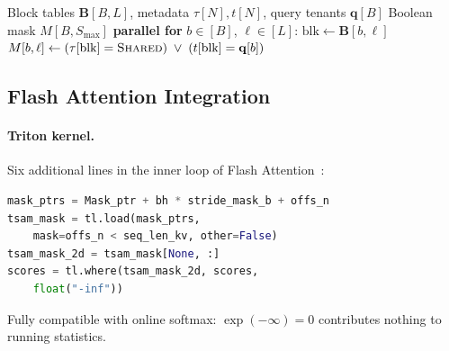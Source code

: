 \documentclass[11pt]{article}
\begin{document}
\begin{algorithm}[t]
\caption{Batched TSAM Mask Generation}
\label{alg:mask-gen}
\begin{algorithmic}[1]
\REQUIRE Block tables $\mathbf{B}[B, L]$, metadata $\tau[N], t[N]$, query tenants $\mathbf{q}[B]$
\ENSURE Boolean mask $M[B, S_{\max}]$
\STATE \textbf{parallel for} $b \in [B]$, $\ell \in [L]$:
\STATE \quad $\mathrm{blk} \gets \mathbf{B}[b, \ell]$
\STATE \quad $M[b, \ell] \gets (\tau[\mathrm{blk}] = \textsc{Shared}) \;\lor\; (t[\mathrm{blk}] = \mathbf{q}[b])$
\end{algorithmic}
\end{algorithm}

\subsection{Flash Attention Integration}
\label{sec:design:flash}

\paragraph{Triton kernel.} Six additional lines in the inner loop of Flash Attention~\citep{dao2022flashattention, dao2023flashattention2, tillet2019triton}:
\begin{lstlisting}[language=Python, caption={TSAM in Triton Flash Attention.}]
mask_ptrs = Mask_ptr + bh * stride_mask_b + offs_n
tsam_mask = tl.load(mask_ptrs,
    mask=offs_n < seq_len_kv, other=False)
tsam_mask_2d = tsam_mask[None, :]
scores = tl.where(tsam_mask_2d, scores,
    float("-inf"))
\end{lstlisting}
Fully compatible with online softmax: $\exp(-\infty) = 0$ contributes nothing to running statistics.
\end{document}
